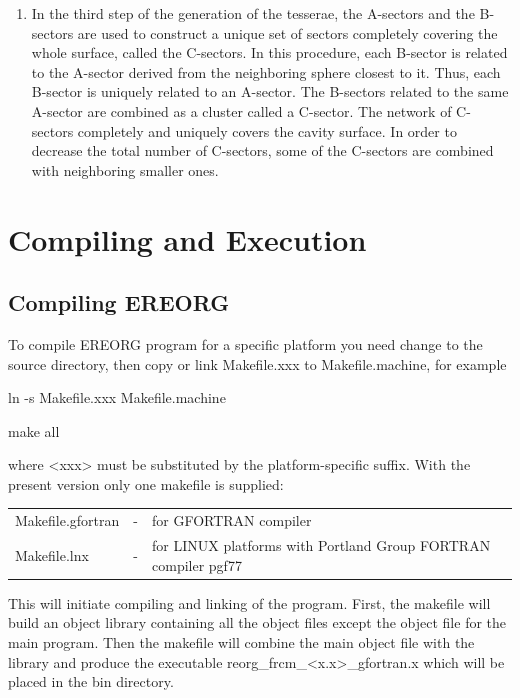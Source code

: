 \documentclass[oneside,11pt,openany]{book}
\newcommand{\tw}{\ttfamily}
\begin{document}
\begin{enumerate}
{The default is NTETFI1=NTETFI2=1, which leads to step sizes of 3$^o$.
This leads to 7200 B-sectors per sphere.}
\item{
In the third step of the generation of the tesserae, 
the A-sectors and the B-sectors are used to construct a unique
set of sectors completely covering the whole surface, called
the C-sectors.  In this procedure, each B-sector is
related to the A-sector derived from the neighboring sphere
closest to it.  Thus, each B-sector is uniquely related
to an A-sector.  The B-sectors related to
the same A-sector are combined as a cluster
called a C-sector.  The network of C-sectors
completely and uniquely covers the cavity surface.
In order to decrease the total number of C-sectors,
some of the C-sectors are combined with neighboring smaller ones.}
\end{enumerate}


\chapter{Compiling and Execution}
\section{Compiling EREORG}
To compile EREORG program for a specific platform you need
change to the {\tw source} directory, then
copy or link {\tw Makefile.xxx} to {\tw Makefile.machine}, for example

\begin{description}
\item {\tw ln -s Makefile.xxx Makefile.machine}
\item {\tw make all}
\end{description}

\noindent where {\tw <xxx>} must be substituted by
the platform-specific suffix. With the present version only one
makefile is supplied:
\par\noindent
\begin{tabular}{lcp{8cm}}
{\tw Makefile.gfortran} &-& for GFORTRAN compiler \\
{\tw Makefile.lnx} &-& for LINUX platforms with Portland
      Group FORTRAN compiler {\tw pgf77} \\
\end{tabular}

This will initiate compiling and linking of the program. First,
the makefile will build an object library containing all the object
files except the object file for the main program. Then the
makefile will combine the main object file with the library
and produce the executable {\tw reorg\_frcm\_<x.x>\_gfortran.x} which will
be placed in the {\tw bin} directory.
\end{document}
